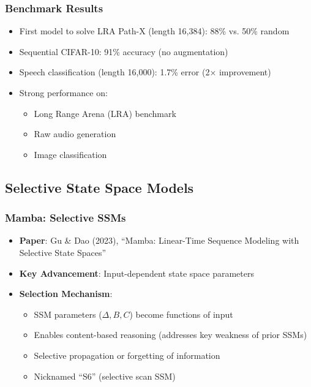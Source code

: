 \documentclass[11pt]{article}
\begin{document}
\subsubsection{Benchmark Results}
\begin{itemize}[leftmargin=*]
    \item First model to solve LRA Path-X (length 16,384): 88\% vs. 50\% random
    \item Sequential CIFAR-10: 91\% accuracy (no augmentation)
    \item Speech classification (length 16,000): 1.7\% error (2× improvement)
    \item Strong performance on:
    \begin{itemize}
        \item Long Range Arena (LRA) benchmark
        \item Raw audio generation
        \item Image classification
    \end{itemize}
\end{itemize}

\subsection{Selective State Space Models}

\subsubsection{Mamba: Selective SSMs}
\begin{itemize}[leftmargin=*]
    \item \textbf{Paper}: Gu \& Dao (2023), ``Mamba: Linear-Time Sequence Modeling with Selective State Spaces''~\cite{gu2023mamba}
    \item \textbf{Key Advancement}: Input-dependent state space parameters
    \item \textbf{Selection Mechanism}:
    \begin{itemize}
        \item SSM parameters ($\Delta, B, C$) become functions of input
        \item Enables content-based reasoning (addresses key weakness of prior SSMs)
        \item Selective propagation or forgetting of information
        \item Nicknamed ``S6'' (selective scan SSM)
    \end{itemize}
\end{itemize}
\end{document}

